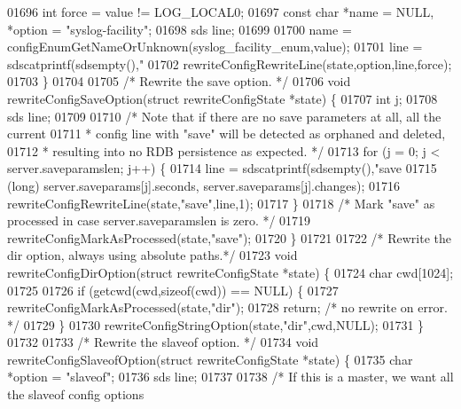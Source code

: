 \begin{DoxyCode}
{{{{{{{{{{{{{{{{{{{{{{{01696     \textcolor{keywordtype}{int} force = value != LOG\_LOCAL0;
01697     \textcolor{keyword}{const} \textcolor{keywordtype}{char} *name = NULL, *option = \textcolor{stringliteral}{"syslog-facility"};
01698     sds line;
01699 
01700     name = configEnumGetNameOrUnknown(syslog\_facility\_enum,value);
01701     line = sdscatprintf(sdsempty(),\textcolor{stringliteral}{"%
01702     rewriteConfigRewriteLine(state,option,line,force);
01703 \}
01704 
01705 \textcolor{comment}{/* Rewrite the save option. */}
01706 \textcolor{keywordtype}{void} rewriteConfigSaveOption(\textcolor{keyword}{struct} rewriteConfigState *state) \{
01707     \textcolor{keywordtype}{int} j;
01708     sds line;
01709 
01710     \textcolor{comment}{/* Note that if there are no save parameters at all, all the current}
01711 \textcolor{comment}{     * config line with "save" will be detected as orphaned and deleted,}
01712 \textcolor{comment}{     * resulting into no RDB persistence as expected. */}
01713     \textcolor{keywordflow}{for} (j = 0; j < server.saveparamslen; j++) \{
01714         line = sdscatprintf(sdsempty(),\textcolor{stringliteral}{"save %
01715             (\textcolor{keywordtype}{long}) server.saveparams[j].seconds, server.saveparams[j].changes);
01716         rewriteConfigRewriteLine(state,\textcolor{stringliteral}{"save"},line,1);
01717     \}
01718     \textcolor{comment}{/* Mark "save" as processed in case server.saveparamslen is zero. */}
01719     rewriteConfigMarkAsProcessed(state,\textcolor{stringliteral}{"save"});
01720 \}
01721 
01722 \textcolor{comment}{/* Rewrite the dir option, always using absolute paths.*/}
01723 \textcolor{keywordtype}{void} rewriteConfigDirOption(\textcolor{keyword}{struct} rewriteConfigState *state) \{
01724     \textcolor{keywordtype}{char} cwd[1024];
01725 
01726     \textcolor{keywordflow}{if} (getcwd(cwd,\textcolor{keyword}{sizeof}(cwd)) == NULL) \{
01727         rewriteConfigMarkAsProcessed(state,\textcolor{stringliteral}{"dir"});
01728         \textcolor{keywordflow}{return}; \textcolor{comment}{/* no rewrite on error. */}
01729     \}
01730     rewriteConfigStringOption(state,\textcolor{stringliteral}{"dir"},cwd,NULL);
01731 \}
01732 
01733 \textcolor{comment}{/* Rewrite the slaveof option. */}
01734 \textcolor{keywordtype}{void} rewriteConfigSlaveofOption(\textcolor{keyword}{struct} rewriteConfigState *state) \{
01735     \textcolor{keywordtype}{char} *option = \textcolor{stringliteral}{"slaveof"};
01736     sds line;
01737 
01738     \textcolor{comment}{/* If this is a master, we want all the slaveof config options}
}}}}}}}}}}}}}}}}}}}}}}}}}
\end{DoxyCode}
